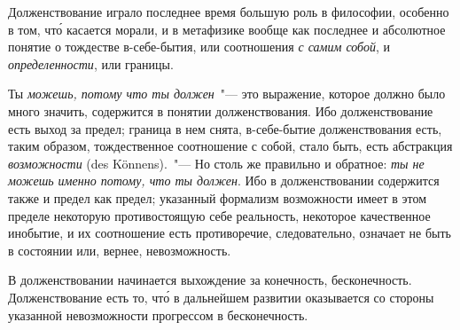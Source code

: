Долженствование играло последнее время большую
роль в философии, особенно в том, чт\'о касается морали,
и в метафизике вообще как последнее и абсолютное понятие
о тождестве в-себе-бытия, или соотношения \emph{с самим
собой}, и \emph{определенности}, или границы.

Ты \emph{можешь, потому что ты должен}\endnotemark{}~"--- это выражение,
которое должно было много значить, содержится в
понятии долженствования. Ибо долженствование есть выход
за предел; граница в нем снята, в-себе-бытие долженствования
есть, таким образом, тождественное соотношение
с собой, стало быть, есть абстракция \emph{возможности}
(des Könnens).~"--- Но столь же правильно и обратное: \emph{ты
не можешь именно потому, что ты должен}. Ибо в долженствовании
содержится также и предел как предел; указанный
формализм возможности имеет в этом пределе некоторую
противостоящую себе реальность, некоторое качественное
инобытие, и их соотношение есть противоречие,
следовательно, означает не быть в состоянии или, вернее,
невозможность.


В долженствовании начинается выхождение за конечность,
бесконечность. Долженствование есть то, чт\'о в
дальнейшем развитии оказывается со стороны указанной
невозможности прогрессом в бесконечность.

